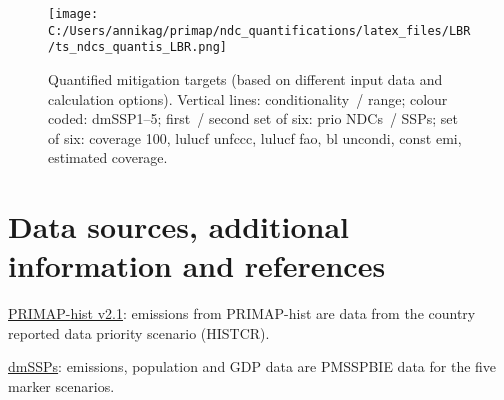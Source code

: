 \documentclass[12pt]{article}
\begin{document}
 \begin{figure}[H]
 \centering
 \texttt{[image: C:/Users/annikag/primap/ndc\_quantifications/latex\_files/LBR/ts\_ndcs\_quantis\_LBR.png]}
 \caption{Quantified mitigation targets (based on different input data and calculation options).
 Vertical lines: conditionality~/ range;
 colour coded: dmSSP1--5;
 first~/ second set of six: prio NDCs~/ SSPs;
 set of six: coverage 100, lulucf unfccc, lulucf fao, bl uncondi, const emi, estimated coverage.}
 \label{fig:miti}
 \end{figure}

 \newpage %
 \section{Data sources, additional information and references}
 \label{sec:dataSourcesRefs}

 \noindent \href{https://dataservices.gfz-potsdam.de/pik/showshort.php?id=escidoc:4736895}{PRIMAP-hist v2.1}: emissions from PRIMAP-hist are data from the country reported data priority scenario (HISTCR).

 \noindent \href{https://zenodo.org/record/3638137#.X2syXouxU2w}{dmSSPs}: emissions, population and GDP data are PMSSPBIE data for the five marker scenarios.
\end{document}
